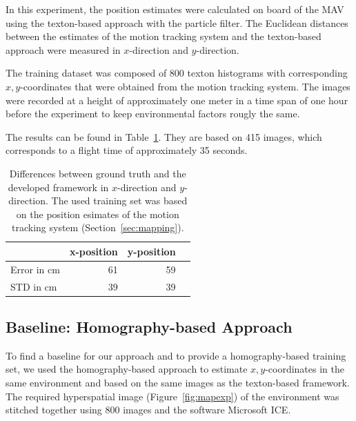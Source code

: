 \documentclass[11pt]{report}
\begin{document}
In this experiment, the position estimates were calculated on board of
the MAV using the texton-based approach with the particle filter. The
Euclidean distances between the estimates of the motion tracking
system and the texton-based approach were measured in $x$-direction
and $y$-direction.

The training dataset was composed of 800 texton histograms with
corresponding $x,y$-coordinates that were obtained from the motion
tracking system. The images were recorded at a height of
approximately one meter in a time span of one hour before the
experiment to keep environmental factors rougly the same.

The results can be found in Table~\ref{tab:route}. They are based on
415 images, which corresponds to a flight time of approximately 35
seconds.

\begin{table}[H]
  \centering
  \begin{tabular}{lrrr}
    \toprule
    & x-position & y-position\\
    \midrule
    Error in cm & 61 & 59\\
    STD in cm & 39 & 39\\
    \bottomrule
  \end{tabular}
  \caption[Estimates of the texton-based approach]{Differences between
    ground truth and the developed framework in $x$-direction and
    $y$-direction. The used training set was based on the position
    esimates of the motion tracking system (Section~\ref{sec:mapping}).}
  \label{tab:route}
\end{table}

\subsection{Baseline: Homography-based Approach}
\label{sec:siftvsoptitrack}

To find a baseline for our approach and to provide a homography-based
training set, we used the homography-based approach to estimate
$x,y$-coordinates in the same environment and based on the same images
as the texton-based framework. The required hyperspatial image
(Figure~\ref{fig:mapexp}) of the environment was stitched together
using 800 images and the software Microsoft ICE.
\end{document}
